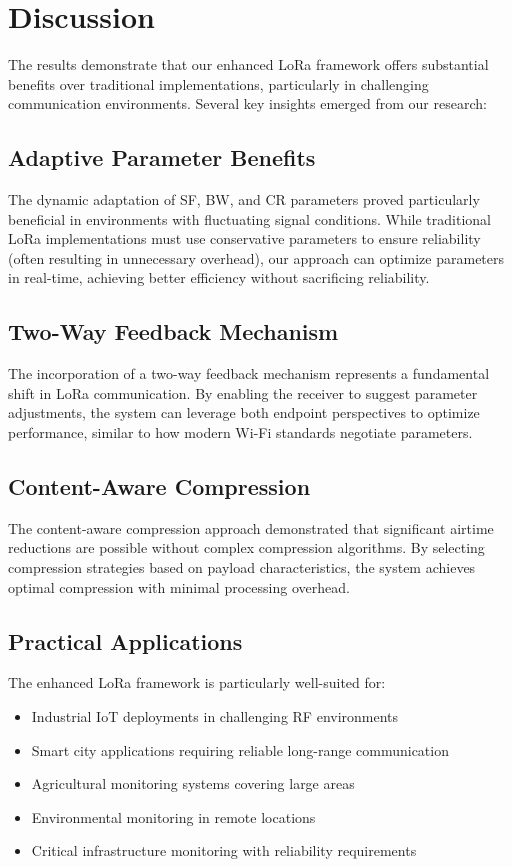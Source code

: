 \documentclass[conference]{IEEEtran}
\begin{document}
\section{Discussion}
The results demonstrate that our enhanced LoRa framework offers substantial benefits over traditional implementations, particularly in challenging communication environments. Several key insights emerged from our research:

\subsection{Adaptive Parameter Benefits}
The dynamic adaptation of SF, BW, and CR parameters proved particularly beneficial in environments with fluctuating signal conditions. While traditional LoRa implementations must use conservative parameters to ensure reliability (often resulting in unnecessary overhead), our approach can optimize parameters in real-time, achieving better efficiency without sacrificing reliability.

\subsection{Two-Way Feedback Mechanism}
The incorporation of a two-way feedback mechanism represents a fundamental shift in LoRa communication. By enabling the receiver to suggest parameter adjustments, the system can leverage both endpoint perspectives to optimize performance, similar to how modern Wi-Fi standards negotiate parameters.

\subsection{Content-Aware Compression}
The content-aware compression approach demonstrated that significant airtime reductions are possible without complex compression algorithms. By selecting compression strategies based on payload characteristics, the system achieves optimal compression with minimal processing overhead.

\subsection{Practical Applications}
The enhanced LoRa framework is particularly well-suited for:
\begin{itemize}
    \item Industrial IoT deployments in challenging RF environments
    \item Smart city applications requiring reliable long-range communication
    \item Agricultural monitoring systems covering large areas
    \item Environmental monitoring in remote locations
    \item Critical infrastructure monitoring with reliability requirements
\end{itemize}
\end{document}
